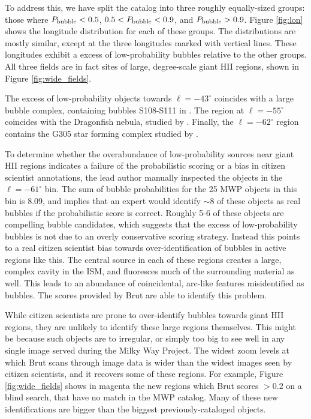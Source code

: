 \documentclass[preprint]{aastex}
\begin{document}
To address this, we have split the catalog into three roughly equally-sized groups: those where $P_{\rm bubble} < 0.5$, $0.5 < P_{\rm bubble} < 0.9$,
and $P_{\rm bubble} > 0.9$. Figure \ref{fig:lon} shows the longitude distribution for each of these groups. The distributions are mostly similar, except at the three longitudes marked with vertical lines. These longitudes exhibit a excess of low-probability bubbles relative to the other groups.  All three fields are in fact sites of large, degree-scale giant HII regions, shown in Figure \ref{fig:wide_fields}. 

The excess of low-probability objects towards $\ell=-43^\circ$ coincides with a large bubble complex, containing bubbles S108-S111 in \cite{Churchwell06}. The region at $\ell=-55^\circ$ coincides with the Dragonfish nebula, studied by \cite{Rahman11}. Finally, the $\ell=-62^\circ$ region contains the G305 star forming complex studied by \cite{Hindson12}.

To determine whether the overabundance of low-probability sources near giant HII regions indicates a failure of the probabilistic scoring or a bias in citizen scientist annotations, the lead author manually inspected the objects in the $\ell=-61^\circ$ bin. The sum of bubble probabilities for the 25 MWP objects in this bin is 8.09, and implies that an expert would identify $\sim 8$ of these objects as real bubbles if the probabilistic score is correct. Roughly 5-6 of these objects are compelling bubble candidates, which suggests that the excess of low-probability bubbles is not due to an overly conservative scoring strategy. Instead this points to a real citizen scientist bias towards over-identification of bubbles in active regions like this. The central source in each of these regions creates a large, complex cavity in the ISM, and fluoresces much of the surrounding material as well. This leads to an abundance of coincidental, arc-like features misidentified as bubbles. The scores provided by Brut are able to identify this problem.

While citizen scientists are prone to over-identify bubbles towards giant HII regions, they are unlikely to identify these large regions themselves. This might be because such objects are to irregular, or simply too big to see well in any single image served during the Milky Way Project. The widest zoom levels at which Brut scans through image data is wider than the widest images seen by citizen scientists, and it recovers some of these regions. For example, Figure \ref{fig:wide_fields} shows in magenta the new regions which Brut scores $>0.2$ on a blind search, that have no match in the MWP catalog. Many of these new identifications are bigger than the biggest previously-cataloged objects.
\end{document}
